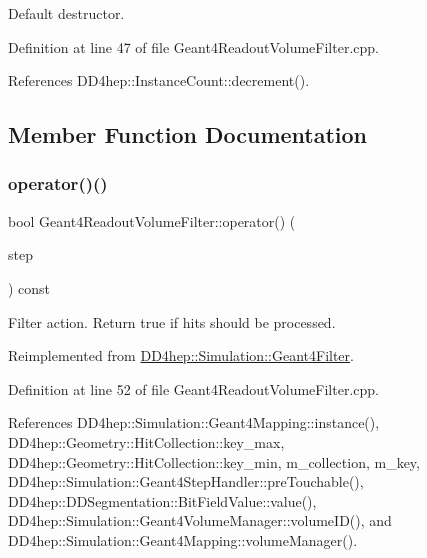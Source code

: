 Default destructor. 



Definition at line 47 of file Geant4\+Readout\+Volume\+Filter.\+cpp.



References D\+D4hep\+::\+Instance\+Count\+::decrement().



\subsection{Member Function Documentation}
\hypertarget{class_d_d4hep_1_1_simulation_1_1_geant4_readout_volume_filter_a50031691fd40aa13e9fdcfe0203cd7f5}{}\label{class_d_d4hep_1_1_simulation_1_1_geant4_readout_volume_filter_a50031691fd40aa13e9fdcfe0203cd7f5} 
\subsubsection{\texorpdfstring{operator()()}{operator()()}}
{\footnotesize\ttfamily bool Geant4\+Readout\+Volume\+Filter\+::operator() (\begin{DoxyParamCaption}\item[{const G4\+Step $\ast$}]{step }\end{DoxyParamCaption}) const\hspace{0.3cm}{\ttfamily [virtual]}}



Filter action. Return true if hits should be processed. 



Reimplemented from \hyperlink{class_d_d4hep_1_1_simulation_1_1_geant4_filter_a373f84ddcbefe180daa058050b6cf753}{D\+D4hep\+::\+Simulation\+::\+Geant4\+Filter}.



Definition at line 52 of file Geant4\+Readout\+Volume\+Filter.\+cpp.



References D\+D4hep\+::\+Simulation\+::\+Geant4\+Mapping\+::instance(), D\+D4hep\+::\+Geometry\+::\+Hit\+Collection\+::key\+\_\+max, D\+D4hep\+::\+Geometry\+::\+Hit\+Collection\+::key\+\_\+min, m\+\_\+collection, m\+\_\+key, D\+D4hep\+::\+Simulation\+::\+Geant4\+Step\+Handler\+::pre\+Touchable(), D\+D4hep\+::\+D\+D\+Segmentation\+::\+Bit\+Field\+Value\+::value(), D\+D4hep\+::\+Simulation\+::\+Geant4\+Volume\+Manager\+::volume\+I\+D(), and D\+D4hep\+::\+Simulation\+::\+Geant4\+Mapping\+::volume\+Manager().




